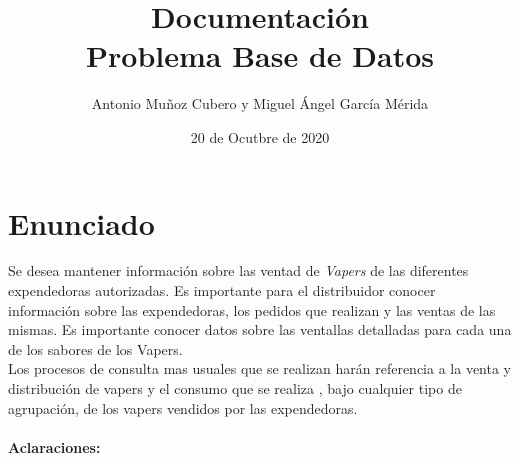 \documentclass{article}
\title{Documentación \\\large \textbf{Problema Base de Datos}}
\author{Antonio Muñoz Cubero y Miguel Ángel García Mérida}
\date{20 de Ocutbre de 2020}
\begin{document}
\maketitle
{}

\newpage
\section{Enunciado}
Se desea mantener información sobre las ventad de \textit{Vapers} de las diferentes expendedoras autorizadas. Es importante para el distribuidor conocer información
sobre las expendedoras, los pedidos que realizan y las ventas de las mismas. Es importante conocer datos sobre las ventallas detalladas para cada una de los sabores de 
los Vapers.
\\
Los procesos de consulta mas usuales que se realizan harán referencia a la venta y distribución de vapers y el consumo que se realiza , bajo cualquier tipo de agrupación,
de los vapers vendidos por las expendedoras.
\\
\\
\textbf{Aclaraciones:}
\\
\end{document}
